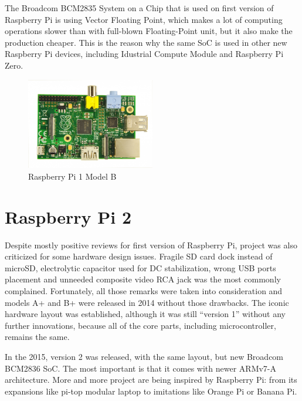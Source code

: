 \documentclass[printmode]{mgr}
\begin{document}
The Broadcom BCM2835 System on a Chip that is used on first version of Raspberry Pi is using Vector Floating Point, which makes a lot of computing operations slower than with full-blown Floating-Point unit, but it also make the production cheaper.
This is the reason why the same SoC is used in other new Raspberry Pi devices, including Idustrial Compute Module and Raspberry Pi Zero.




\begin{figure}[htbp]
  \centering
    \includegraphics[width=0.5\textwidth]{raspberrypi-front.jpg}
  \caption{Raspberry Pi 1 Model B}
  \label{fig:devboard-raspberrypi}
\end{figure}


\section{Raspberry Pi 2}

Despite mostly positive reviews for first version of Raspberry Pi, project was also criticized for some hardware design issues.
Fragile SD card dock instead of microSD, electrolytic capacitor used for DC stabilization, wrong USB ports placement and unneeded composite video RCA jack was the most commonly complained.\cite{web:raspberrypi-issues}
Fortunately, all those remarks were taken into consideration and models A+ and B+ were released in 2014 without those drawbacks.
The iconic hardware layout was established, although it was still ``version 1'' without any further innovations, because all of the core parts, including microcontroller, remains the same.

In the 2015, version 2 was released, with the same layout, but new Broadcom BCM2836 SoC.
The most important is that it comes with newer ARMv7-A architecture.
More and more project are being inspired by Raspberry Pi: from its expansions like pi-top modular laptop to imitations like Orange Pi or Banana Pi.\cite{web:pi-top}
\end{document}
